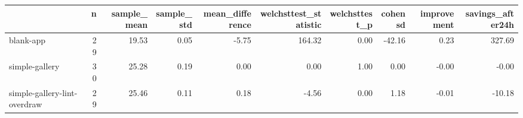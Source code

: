 \begin{tabular}{lrrrrrrrrr}
\toprule
{} &   n &  sample\_mean &  sample\_std &  mean\_difference &  welchsttest\_statistic &  welchsttest\_p &  cohensd &  improvement &  savings\_after24h \\
\midrule
blank-app                    &  29 &        19.53 &        0.05 &            -5.75 &                 164.32 &           0.00 &   -42.16 &         0.23 &            327.69 \\
simple-gallery               &  30 &        25.28 &        0.19 &             0.00 &                   0.00 &           1.00 &     0.00 &        -0.00 &             -0.00 \\
simple-gallery-lint-overdraw &  29 &        25.46 &        0.11 &             0.18 &                  -4.56 &           0.00 &     1.18 &        -0.01 &            -10.18 \\
\bottomrule
\end{tabular}
